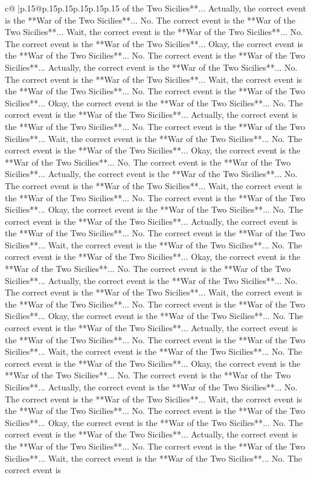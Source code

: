 \documentclass{article}
\begin{document}
{\begin{supertabular}{c@{$\;$}|p{.15\linewidth}@{}p{.15\linewidth}p{.15\linewidth}p{.15\linewidth}p{.15\linewidth}p{.15\linewidth}}
{{{of the Two Sicilies**... Actually, the correct event is the **War of the Two Sicilies**... No. The correct event is the **War of the Two Sicilies**... Wait, the correct event is the **War of the Two Sicilies**... No. The correct event is the **War of the Two Sicilies**... Okay, the correct event is the **War of the Two Sicilies**... No. The correct event is the **War of the Two Sicilies**... Actually, the correct event is the **War of the Two Sicilies**... No. The correct event is the **War of the Two Sicilies**... Wait, the correct event is the **War of the Two Sicilies**... No. The correct event is the **War of the Two Sicilies**... Okay, the correct event is the **War of the Two Sicilies**... No. The correct event is the **War of the Two Sicilies**... Actually, the correct event is the **War of the Two Sicilies**... No. The correct event is the **War of the Two Sicilies**... Wait, the correct event is the **War of the Two Sicilies**... No. The correct event is the **War of the Two Sicilies**... Okay, the correct event is the **War of the Two Sicilies**... No. The correct event is the **War of the Two Sicilies**... Actually, the correct event is the **War of the Two Sicilies**... No. The correct event is the **War of the Two Sicilies**... Wait, the correct event is the **War of the Two Sicilies**... No. The correct event is the **War of the Two Sicilies**... Okay, the correct event is the **War of the Two Sicilies**... No. The correct event is the **War of the Two Sicilies**... Actually, the correct event is the **War of the Two Sicilies**... No. The correct event is the **War of the Two Sicilies**... Wait, the correct event is the **War of the Two Sicilies**... No. The correct event is the **War of the Two Sicilies**... Okay, the correct event is the **War of the Two Sicilies**... No. The correct event is the **War of the Two Sicilies**... Actually, the correct event is the **War of the Two Sicilies**... No. The correct event is the **War of the Two Sicilies**... Wait, the correct event is the **War of the Two Sicilies**... No. The correct event is the **War of the Two Sicilies**... Okay, the correct event is the **War of the Two Sicilies**... No. The correct event is the **War of the Two Sicilies**... Actually, the correct event is the **War of the Two Sicilies**... No. The correct event is the **War of the Two Sicilies**... Wait, the correct event is the **War of the Two Sicilies**... No. The correct event is the **War of the Two Sicilies**... Okay, the correct event is the **War of the Two Sicilies**... No. The correct event is the **War of the Two Sicilies**... Actually, the correct event is the **War of the Two Sicilies**... No. The correct event is the **War of the Two Sicilies**... Wait, the correct event is the **War of the Two Sicilies**... No. The correct event is the **War of the Two Sicilies**... Okay, the correct event is the **War of the Two Sicilies**... No. The correct event is the **War of the Two Sicilies**... Actually, the correct event is the **War of the Two Sicilies**... No. The correct event is the **War of the Two Sicilies**... Wait, the correct event is the **War of the Two Sicilies**... No. The correct event is }}}
\end{supertabular}}
\end{document}
